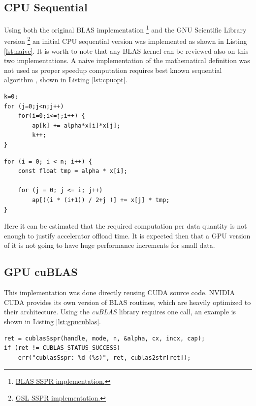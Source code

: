\documentclass{llncs}
\begin{document}
\subsection{CPU Sequential}

Using both the original BLAS implementation \footnote{\href{http://www.netlib.org/blas/sspr.f}{BLAS SSPR implementation.}} and the GNU Scientific Library version \footnote{\href{gsl/blas/source\_spr.h}{GSL SSPR implementation.}} an initial CPU sequential version was implemented as shown in Listing \ref{lst:naive}.
It is worth to note that any BLAS kernel can be reviewed also on this two implementations.
A naive implementation of the mathematical definition was not used as proper speedup computation requires best known sequential algorithm \cite{debunking}, shown in Listing \ref{lst:cpuopt}.

\begin{lstlisting}[caption={Naive SSPR CPU Implementation},label={lst:naive}]
k=0;
for (j=0;j<n;j++)
	for(i=0;i<=j;i++) {
		ap[k] += alpha*x[i]*x[j];
		k++;
}
\end{lstlisting}

\begin{lstlisting}[caption={Optimized SSPR CPU Implementation},label={lst:cpuopt}]
for (i = 0; i < n; i++) {
	const float tmp = alpha * x[i];

	for (j = 0; j <= i; j++)
		ap[((i * (i+1)) / 2+j )] += x[j] * tmp;
}
\end{lstlisting}

Here it can be estimated that the required computation per data quantity is not enough to justify accelerator offload time. It is expected then that a GPU version of it is not going to have huge performance increments for small data.

\subsection{GPU cuBLAS}

This implementation was done directly reusing CUDA source code.
NVIDIA CUDA \cite{cuda} provides its own version of BLAS routines, which are heavily optimized to their architecture. Using the {\it cuBLAS} \cite{cublas} library requires one call, an example is shown in Listing \ref{lst:gpucublas}.

\begin{lstlisting}[caption={cuBLAS SSPR GPU Implementation}, label={lst:gpucublas}]
ret = cublasSspr(handle, mode, n, &alpha, cx, incx, cap);
if (ret != CUBLAS_STATUS_SUCCESS)
	err("cublasSspr: %d (%s)", ret, cublas2str[ret]);
\end{lstlisting}
\end{document}
